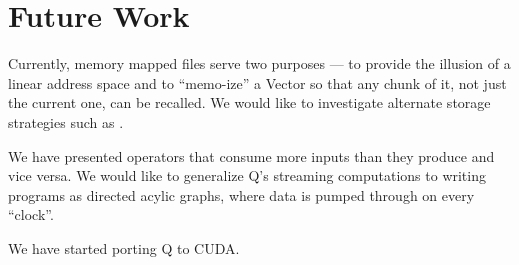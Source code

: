 \section{Future Work}

Currently, memory mapped files serve two purposes --- to provide the illusion of
a linear address space and to ``memo-ize'' a Vector so that any chunk of it, not
just the current one, can be recalled. We would like to investigate alternate
storage strategies such as \cite{ramcloud2009}.

We have presented operators that consume more inputs than they produce and vice
versa. We would like to generalize Q's streaming computations to writing
programs as directed acylic graphs, where data is
pumped through on every ``clock''.

We have started porting Q to CUDA. \TBC

